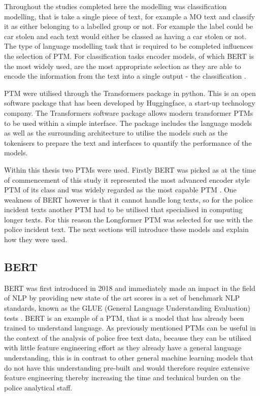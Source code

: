 Throughout the studies completed here the modelling was classification modelling, that is take a single piece of text, for example a MO text and classify it as either belonging to a labelled group or not. For example the label could be car stolen and each text would either be classed as having a car stolen or not. The type of language modelling task that is required to be completed influences the selection of PTM. For classification tasks encoder models, of which BERT is the most widely used, are the most appropriate selection as they are able to encode the information from the text into a single output - the classification \parencite{PTMsurvey}. 

PTM were utilised through the Transformers package \parencite{wolf2019huggingface} in python. This is an open software package that has been developed by Huggingface, a start-up technology company. The Transformers software package allows modern transformer PTMs to be used within a simple interface. The package includes the language models as well as the surrounding architecture to utilise the models such as the tokenisers to prepare the text and interfaces to quantify the performance of the models.

Within this thesis two PTMs were used. Firstly BERT was picked as at the time of commencement of this study it represented the most advanced encoder style PTM of its class and was widely regarded as the most capable PTM \parencite{PTMsurvey}. One weakness of BERT however is that it cannot handle long texts, so for the police incident texts another PTM had to be utilised that specialised in computing longer texts. For this reason the Longformer PTM was selected for use with the police incident text. The next sections will introduce these models and explain how they were used.

\subsection{BERT} BERT was first introduced in 2018 \parencite{devlin2018bert} and immediately made an impact in the field of NLP by providing new state of the art scores in a set of benchmark NLP standards, known as the GLUE (General Language Understanding Evaluation) tests \parencite{wang2018glue}. BERT is an example of a PTM, that is a model that has already been trained to understand language. As previously mentioned PTMs can be useful in the context of the analysis of police free text data, because they can be utilised with little feature engineering effort as they already have a general language understanding, this is in contrast to other general machine learning models that do not have this understanding pre-built and would therefore require extensive feature engineering thereby increasing the time and technical burden on the police analytical staff. 

